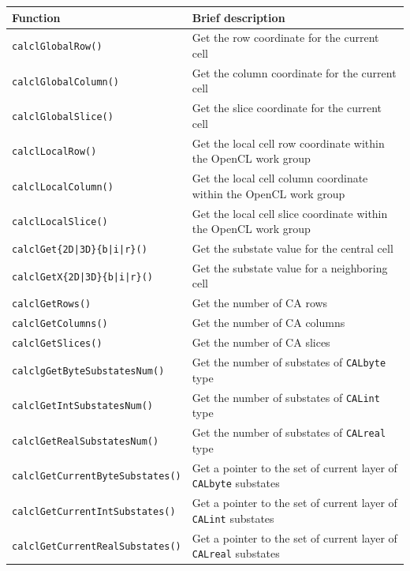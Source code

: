 \begin{table}
  \centering
  \begin{footnotesize}
  \begin{tabular}{l|l}
    \hline
    Function & Brief description\\
    \hline
    \verb'calclGlobalRow()'               & Get the row coordinate for the current cell \\
    \verb'calclGlobalColumn()'            & Get the column coordinate for the current cell \\
    \verb'calclGlobalSlice()'             & Get the slice coordinate for the current cell \\
    \verb'calclLocalRow() '               & Get the local cell row coordinate within the OpenCL work group\\
    \verb'calclLocalColumn()'             & Get the local cell column coordinate within the OpenCL work group\\
    \verb'calclLocalSlice()'              & Get the local cell slice coordinate within the OpenCL work group\\
    \verb'calclGet{2D|3D}{b|i|r}()'       & Get the substate value for the central cell\\
    \verb'calclGetX{2D|3D}{b|i|r}()'      & Get the substate value for a neighboring cell\\
    \verb'calclGetRows()'                 & Get the number of CA rows \\
    \verb'calclGetColumns()'              & Get the number of CA columns \\
    \verb'calclGetSlices()'               & Get the number of CA slices \\
    \verb'calclgGetByteSubstatesNum()'    & Get the number of substates of \verb'CALbyte' type \\
    \verb'calclGetIntSubstatesNum()'      & Get the number of substates of \verb'CALint' type \\
    \verb'calclGetRealSubstatesNum()'     & Get the number of substates of \verb'CALreal' type \\
    \verb'calclGetCurrentByteSubstates()' & Get a pointer to the set of current layer of \verb'CALbyte' substates \\
    \verb'calclGetCurrentIntSubstates()'  & Get a pointer to the set of current layer of \verb'CALint' substates \\
    \verb'calclGetCurrentRealSubstates()' & Get a pointer to the set of current layer of \verb'CALreal' substates \\

\end{tabular}
\end{footnotesize}
\end{table}
